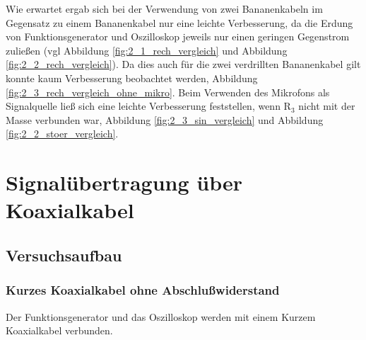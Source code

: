 \documentclass[12pt,a4paper]{article}
\begin{document}
Wie erwartet ergab sich bei der Verwendung von zwei Bananenkabeln im Gegensatz zu einem Bananenkabel nur eine leichte Verbesserung, da die Erdung von Funktionsgenerator und Oszilloskop jeweils nur einen geringen Gegenstrom zuließen (vgl Abbildung \ref{fig:2_1_rech_vergleich} und Abbildung \ref{fig:2_2_rech_vergleich}).
Da dies auch für die zwei verdrillten Bananenkabel gilt konnte kaum Verbesserung beobachtet werden, Abbildung \ref{fig:2_3_rech_vergleich_ohne_mikro}. Beim Verwenden des Mikrofons als Signalquelle ließ sich eine leichte Verbesserung feststellen, wenn R$_3$ nicht mit der Masse verbunden war, Abbildung \ref{fig:2_3_sin_vergleich} und Abbildung \ref{fig:2_2_stoer_vergleich}.


\section{Signalübertragung über Koaxialkabel}
\subsection{Versuchsaufbau}


\subsubsection{Kurzes Koaxialkabel ohne Abschlußwiderstand}

Der Funktionsgenerator und das Oszilloskop werden mit einem Kurzem Koaxialkabel verbunden.
\end{document}
